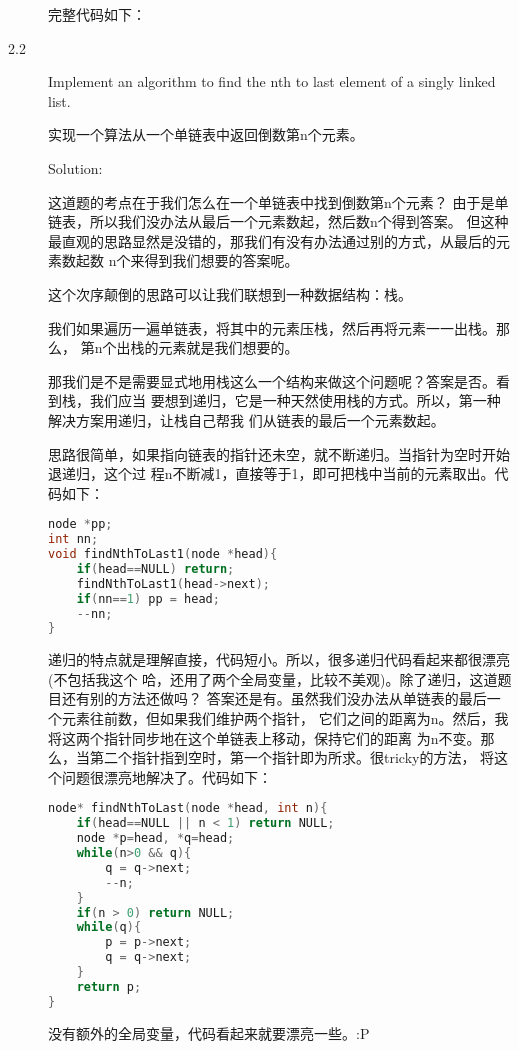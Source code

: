\begin{description}
完整代码如下：



\item[2.2] Implement an algorithm to find the nth to last element of a singly linked list.

实现一个算法从一个单链表中返回倒数第n个元素。


Solution: 

这道题的考点在于我们怎么在一个单链表中找到倒数第n个元素？ 由于是单链表，所以我们没办法从最后一个元素数起，然后数n个得到答案。 但这种最直观的思路显然是没错的，那我们有没有办法通过别的方式，从最后的元素数起数 n个来得到我们想要的答案呢。

这个次序颠倒的思路可以让我们联想到一种数据结构：栈。

我们如果遍历一遍单链表，将其中的元素压栈，然后再将元素一一出栈。那么， 第n个出栈的元素就是我们想要的。

那我们是不是需要显式地用栈这么一个结构来做这个问题呢？答案是否。看到栈，我们应当 要想到递归，它是一种天然使用栈的方式。所以，第一种解决方案用递归，让栈自己帮我 们从链表的最后一个元素数起。

思路很简单，如果指向链表的指针还未空，就不断递归。当指针为空时开始退递归，这个过 程n不断减1，直接等于1，即可把栈中当前的元素取出。代码如下：

\begin{lstlisting}[language=C++]
node *pp;
int nn;
void findNthToLast1(node *head){
    if(head==NULL) return;
    findNthToLast1(head->next);
    if(nn==1) pp = head;
    --nn;
}
\end{lstlisting}

递归的特点就是理解直接，代码短小。所以，很多递归代码看起来都很漂亮(不包括我这个 哈，还用了两个全局变量，比较不美观)。除了递归，这道题目还有别的方法还做吗？ 答案还是有。虽然我们没办法从单链表的最后一个元素往前数，但如果我们维护两个指针， 它们之间的距离为n。然后，我将这两个指针同步地在这个单链表上移动，保持它们的距离 为n不变。那么，当第二个指针指到空时，第一个指针即为所求。很tricky的方法， 将这个问题很漂亮地解决了。代码如下：

\begin{lstlisting}[language=C++]
node* findNthToLast(node *head, int n){
    if(head==NULL || n < 1) return NULL;
    node *p=head, *q=head;
    while(n>0 && q){
        q = q->next;
        --n;
    }
    if(n > 0) return NULL;
    while(q){
        p = p->next;
        q = q->next;
    }
    return p;
}
\end{lstlisting}
没有额外的全局变量，代码看起来就要漂亮一些。:P


\end{description}

